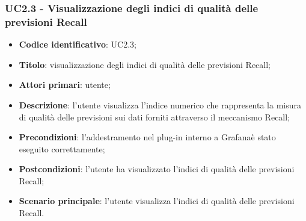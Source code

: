 \subsubsection{UC2.3 - Visualizzazione degli indici di qualità delle previsioni Recall}
\begin{itemize}
	\item \textbf{Codice identificativo}: UC2.3;
	\item \textbf{Titolo}: visualizzazione degli indici di qualità delle previsioni Recall\glo;
	\item \textbf{Attori primari}: utente;
	\item \textbf{Descrizione}: l'utente visualizza l'indice numerico che rappresenta la misura di qualità delle previsioni sui dati forniti attraverso il meccanismo Recall\glo;
	\item \textbf{Precondizioni}: l'addestramento nel plug-in interno a Grafana\glosp è stato eseguito correttamente;
	\item \textbf{Postcondizioni}: l'utente ha visualizzato l'indici di qualità delle previsioni Recall\glo;
	\item \textbf{Scenario principale}: l'utente visualizza l'indici di qualità delle previsioni Recall\glo.
\end{itemize} 
